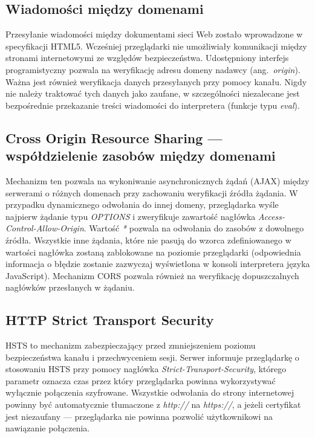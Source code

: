 \documentclass[11pt,a4paper,polish,thesis,oneside]{dcsbook}
\begin{document}
\subsection{Wiadomości między domenami}
Przesyłanie wiadomości między dokumentami sieci Web zostało wprowadzone w specyfikacji HTML5. Wcześniej przeglądarki nie umożliwiały komunikacji między stronami internetowymi ze względów bezpieczeństwa. Udostępniony interfejs programistyczny pozwala na weryfikację adresu domeny nadawcy (ang.~\textit{origin}). Ważna jest również weryfikacja danych przesyłanych przy pomocy kanału. Nigdy nie należy traktować tych danych jako zaufane, w szczególności niezalecane jest bezpośrednie przekazanie treści wiadomości do interpretera (funkcje typu \textit{eval}).

\subsection{Cross Origin Resource Sharing --- współdzielenie zasobów między domenami}
Mechanizm ten pozwala na wykoniwanie asynchronicznych żądań (AJAX) między serwerami o różnych domenach przy zachowaniu weryfikacji źródła żądania. W przypadku dynamicznego odwołania do innej domeny, przeglądarka wyśle najpierw żądanie typu \textit{OPTIONS} i zweryfikuje zawartość nagłówka \textit{Access-Control-Allow-Origin}. Wartość \textit{*} pozwala na odwołania do zasobów z dowolnego źródła. Wszystkie inne żądania, które nie pasują do wzorca zdefiniowanego w wartości nagłówka zostaną zablokowane na poziomie przeglądarki (odpowiednia informacja o błędzie zostanie zazwyczaj wyświetlona w konsoli interpretera języka JavaScript). Mechanizm CORS pozwala również na weryfikację dopuszczalnych nagłówków przesłanych w żądaniu.

\subsection{HTTP Strict Transport Security}
HSTS to mechanizm zabezpieczający przed zmniejszeniem poziomu bezpieczeństwa kanału i przechwyceniem sesji. Serwer informuje przeglądarkę o stosowaniu HSTS przy pomocy nagłówka \textit{Strict-Transport-Security}, którego parametr oznacza czas przez który przeglądarka powinna wykorzystywać wyłącznie połączenia szyfrowane. Wszystkie odwołania do strony internetowej powinny być automatycznie tłumaczone z \textit{http://} na \textit{https://}, a jeżeli certyfikat jest niezaufany --- przeglądarka nie powinna pozwolić użytkownikowi na nawiązanie połączenia.
\end{document}
